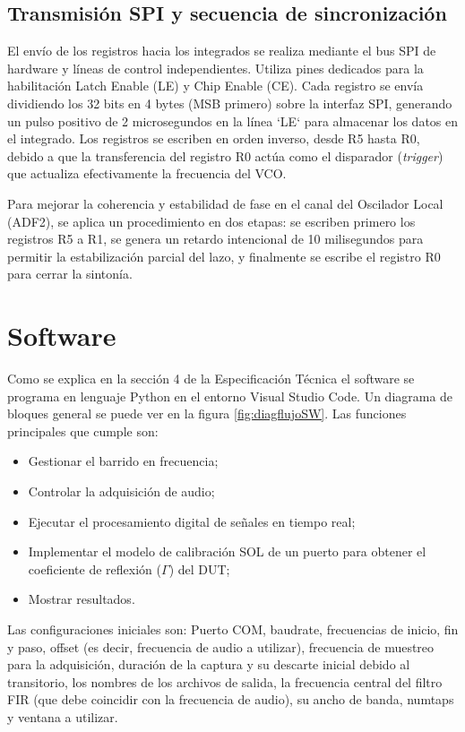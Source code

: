 \subsection{Transmisión SPI y secuencia de sincronización}
El envío de los registros hacia los integrados se realiza mediante el bus SPI de hardware y líneas de control independientes. Utiliza pines dedicados para la habilitación Latch Enable (LE) y Chip Enable (CE). Cada registro se envía dividiendo los 32 bits en 4 bytes (MSB primero) sobre la interfaz SPI, generando un pulso positivo de 2 microsegundos en la línea `LE` para almacenar los datos en el integrado. Los registros se escriben en orden inverso, desde R5 hasta R0, debido a que la transferencia del registro R0 actúa como el disparador (\textit{trigger}) que actualiza efectivamente la frecuencia del VCO. 

Para mejorar la coherencia y estabilidad de fase en el canal del Oscilador Local (ADF2), se aplica un procedimiento en dos etapas: se escriben primero los registros R5 a R1, se genera un retardo intencional de 10 milisegundos para permitir la estabilización parcial del lazo, y finalmente se escribe el registro R0 para cerrar la sintonía.

\section{Software}


Como se explica en la sección 4 de la Especificación Técnica \cite{ET} el software se programa en lenguaje Python en el entorno Visual Studio Code. Un diagrama de bloques general se puede ver en la figura \ref{fig:diagflujoSW}. Las funciones principales que cumple son:

\begin{itemize}
    \item Gestionar el barrido en frecuencia;
    \item Controlar la adquisición de audio;
    \item Ejecutar el procesamiento digital de señales en tiempo real;
    \item Implementar el modelo de calibración SOL de un puerto para obtener el coeficiente de reflexión ($\Gamma$) del DUT;
    \item Mostrar resultados.
\end{itemize}

Las configuraciones iniciales son: Puerto COM, baudrate, frecuencias de inicio, fin y paso, offset (es decir, frecuencia de audio a utilizar), frecuencia de muestreo para la adquisición, duración de la captura y su descarte inicial debido al transitorio, los nombres de los archivos de salida, la frecuencia central del filtro FIR (que debe coincidir con la frecuencia de audio), su ancho de banda, numtaps y ventana a utilizar.

